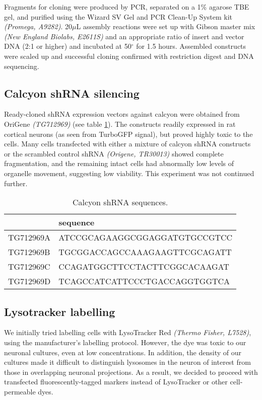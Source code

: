 \documentclass[
  12pt,
  a4paper,
]{book}
\begin{document}
Fragments for cloning were produced by PCR, separated on a 1\% agarose TBE gel, and purified using the Wizard SV Gel and PCR Clean-Up System kit \emph{(Promega, A9282)}. 20\(\mu\)L assembly reactions were set up with Gibson master mix \emph{(New England Biolabs, E2611S)} and an appropriate ratio of insert and vector DNA (2:1 or higher) and incubated at 50\(^{\circ}\) for 1.5 hours. Assembled constructs were scaled up and successful cloning confirmed with restriction digest and DNA sequencing.

\hypertarget{calcyon-shrna-silencing}{%
\subsection{Calcyon shRNA silencing}\label{calcyon-shrna-silencing}}

Ready-cloned shRNA expression vectors against calcyon were obtained from OriGene \emph{(TG712969)} (see table \ref{tab:caly-tab}). The constructs readily expressed in rat cortical neurons (as seen from TurboGFP signal), but proved highly toxic to the cells. Many cells transfected with either a mixture of calcyon shRNA constructs or the scrambled control shRNA \emph{(Origene, TR30013)} showed complete fragmentation, and the remaining intact cells had abnormally low levels of organelle movement, suggesting low viability. This experiment was not continued further.

\begin{table}

\caption{\label{tab:caly-tab}Calcyon shRNA sequences.}
\centering
\begin{tabular}[t]{ll}
\toprule
  & sequence\\
\midrule
TG712969A & ATCCGCAGAAGGCGGAGGATGTGCCGTCC\\
TG712969B & TGCGGACCAGCCAAAGAAGTTCGCAGATT\\
TG712969C & CCAGATGGCTTCCTACTTCGGCACAAGAT\\
TG712969D & TCAGCCATCATTCCCTGACCAGGTGGTCA\\
\bottomrule
\end{tabular}
\end{table}

\hypertarget{lysotracker-labelling}{%
\subsection{Lysotracker labelling}\label{lysotracker-labelling}}

We initially tried labelling cells with LysoTracker Red \emph{(Thermo Fisher, L7528)}, using the manufacturer's labelling protocol. However, the dye was toxic to our neuronal cultures, even at low concentrations. In addition, the density of our cultures made it difficult to distinguish lysosomes in the neuron of interest from those in overlapping neuronal projections. As a result, we decided to proceed with transfected fluorescently-tagged markers instead of LysoTracker or other cell-permeable dyes.
\end{document}
